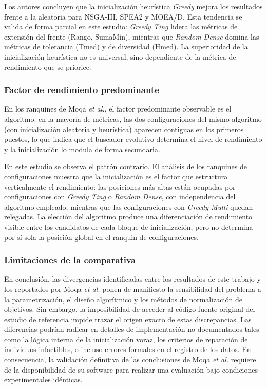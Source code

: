 Los autores concluyen que la inicialización heurística \textit{Greedy} mejora los resultados frente a la aleatoria para NSGA-III, SPEA2 y MOEA/D. Esta tendencia se valida de forma parcial en este estudio: \textit{Greedy Ting} lidera las métricas de extensión del frente (Rango, SumaMín), mientras que \textit{Random Dense} domina las métricas de tolerancia (Tmed) y de diversidad (Hmed). La superioridad de la inicialización heurística no es universal, sino dependiente de la métrica de rendimiento que se priorice.

\subsubsection*{Factor de rendimiento predominante}

En los ranquines de Moqa \textit{et al.}, el factor predominante observable es el algoritmo: en la mayoría de métricas, las dos configuraciones del mismo algoritmo (con inicialización aleatoria y heurística) aparecen contiguas en los primeros puestos, lo que indica que el buscador evolutivo determina el nivel de rendimiento y la inicialización lo modula de forma secundaria.

En este estudio se observa el patrón contrario. El análisis de los ranquines de configuraciones muestra que la inicialización es el factor que estructura verticalmente el rendimiento: las posiciones más altas están ocupadas por configuraciones con \textit{Greedy Ting} o \textit{Random Dense}, con independencia del algoritmo empleado, mientras que las configuraciones con \textit{Greedy Multi} quedan relegadas. La elección del algoritmo produce una diferenciación de rendimiento visible entre los candidatos de cada bloque de inicialización, pero no determina por sí sola la posición global en el ranquin de configuraciones.

\subsubsection*{Limitaciones de la comparativa}

En conclusión, las divergencias identificadas entre los resultados de este trabajo y los reportados por Moqa \textit{et al.} ponen de manifiesto la sensibilidad del problema a la parametrización, el diseño algorítmico y los métodos de normalización de objetivos. Sin embargo, la imposibilidad de acceder al código fuente original del estudio de referencia impide trazar el origen exacto de estas discrepancias. Las diferencias podrían radicar en detalles de implementación no documentados tales como la lógica interna de la inicialización voraz, los criterios de reparación de individuos infactibles, o incluso errores formales en el registro de los datos. En consecuencia, la validación definitiva de las conclusiones de Moqa \textit{et al.} requiere de la disponibilidad de su software para realizar una evaluación bajo condiciones experimentales idénticas.
